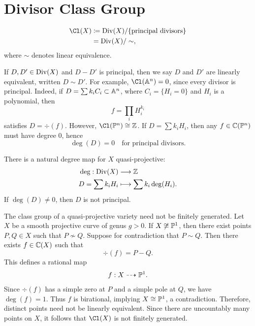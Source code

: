 
\section{Divisor Class Group}

\begin{definition}
    \begin{align*}
        \Cl(X) &\coloneqq \Div(X) / \{\text{principal divisors}\} \\
        &= \Div(X)/\sim,
    \end{align*}
    where $\sim$ denotes linear equivalence.
\end{definition}

If $D, D'\in \Div(X)$ and $D - D'$ is principal, then we say $D$ and $D'$ are linearly equivalent, written $D \sim D'$.
For example, $\Cl(\aa^n) = 0$, since every divisor is principal.
Indeed, if $D = \sum k_i C_i \subset \aa^n$, where $C_i = \{H_i = 0\}$ and $H_i$ is a polynomial, then
\[
    f = \prod_i H_i^{k_i}
\]
satisfies $D = \div(f)$.
However, $\Cl(\pp^n) \cong \z$.
If $D = \sum k_i H_i$, then any $f\in \c(\pp^n)$ must have degree $0$, hence
\[
    \deg(D) = 0 \quad \text{for principal divisors}.
\]

\begin{proposition*}{
    There is a natural degree map for $X$ quasi-projective:
    \begin{align*}
        \deg : \Div(X) &\longrightarrow \z \\
        D = \sum k_i H_i &\longmapsto \sum k_i \deg(H_i).
    \end{align*}
    If $\deg(D) \neq 0$, then $D$ is not principal.
}
\end{proposition*}

The class group of a quasi-projective variety need not be finitely generated.
Let $X$ be a smooth projective curve of genus $g > 0$.
If $X \not\cong \pp^1$, then there exist points $P,Q\in X$ such that $P \nsim Q$.
Suppose for contradiction that $P \sim Q$.
Then there exists $f\in \c(X)$ such that
\[
    \div(f) = P - Q.
\]
This defines a rational map
\[
    f : X \dashrightarrow \pp^1.
\]
Since $\div(f)$ has a simple zero at $P$ and a simple pole at $Q$, we have $\deg(f) = 1$.
Thus $f$ is birational, implying $X \cong \pp^1$, a contradiction.
Therefore, distinct points need not be linearly equivalent.
Since there are uncountably many points on $X$, it follows that $\Cl(X)$ is not finitely generated.